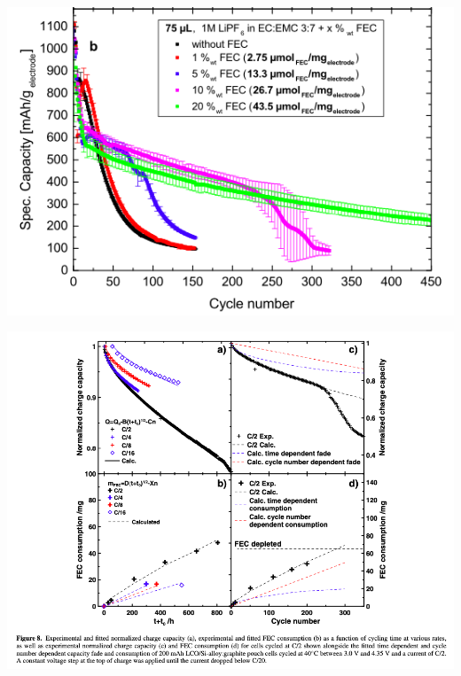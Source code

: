 \documentclass{article}
\begin{document}
{
\centering
\includegraphics[scale=0.5]{images/Jung_et_al_Figure1b.png}
}

\includegraphics[scale=0.45]{images/Petibon_et_al_Figure8.png}
\end{document}
